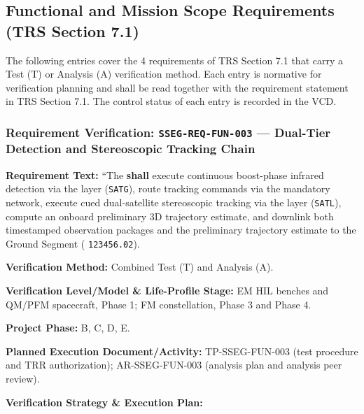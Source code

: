 \subsection{Functional and Mission Scope Requirements (TRS Section 7.1)}
The following entries cover the 4 requirements of TRS Section 7.1 that carry a Test (T) or Analysis (A) verification method. Each entry is normative for verification planning and shall be read together with the requirement statement in TRS Section 7.1. The control status of each entry is recorded in the VCD.
\subsubsection{Requirement Verification: \texttt{SSEG-REQ-FUN-003} --- Dual-Tier Detection and Stereoscopic Tracking Chain}
\label{ver:SSEG-REQ-FUN-003}
\textbf{Requirement Text:} ``The  \textbf{shall} execute continuous boost-phase infrared detection via the  layer (\texttt{SATG}), route tracking commands via the mandatory  network, execute cued dual-satellite stereoscopic tracking via the  layer (\texttt{SATL}), compute an onboard preliminary 3D trajectory estimate, and downlink both timestamped  observation packages and the preliminary trajectory estimate to the Ground Segment ( \texttt{123456.02}).
\par\textbf{Verification Method:} Combined Test (T) and Analysis (A).
\par\textbf{Verification Level/Model \& Life-Profile Stage:} EM HIL benches and QM/PFM spacecraft, Phase 1; FM constellation, Phase 3 and Phase 4.
\par\textbf{Project Phase:} B, C, D, E.
\par\textbf{Planned Execution Document/Activity:} TP-SSEG-FUN-003 (test procedure and TRR authorization); AR-SSEG-FUN-003 (analysis plan and analysis peer review).
\par\textbf{Verification Strategy \& Execution Plan:}
